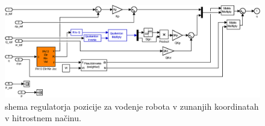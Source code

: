 \begin{figure}[!h]
	\centering
	\includegraphics[width=\textwidth]{./Slike/sim_zunanje_koordinate_vel.eps}
	\caption{\simulink shema regulatorja pozicije za vodenje robota v zunanjih koordinatah v hitrostnem na\v{c}inu.}
	\label{fig:zunanje_koordinate_vel}
\end{figure}
